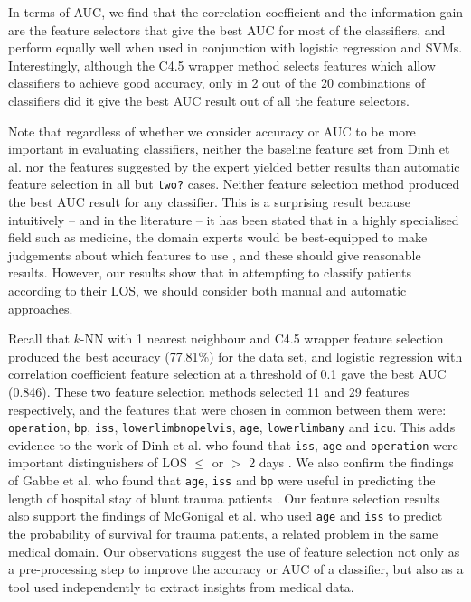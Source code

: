 \documentclass{article}
\begin{document}
In terms of AUC, we
find that the correlation coefficient and the information gain are the feature
selectors that give the best AUC for most of the classifiers, and perform
equally well when used in conjunction with logistic regression and SVMs.
Interestingly, although the C4.5
wrapper method selects features which allow classifiers to achieve good
accuracy, only in 2 out of the 20 combinations of classifiers did it give the
best AUC result out of all the feature selectors.

Note that regardless of whether we consider accuracy or AUC to be more
important in evaluating classifiers, neither the baseline
feature set from Dinh et al. \cite{Dinh2013a} nor the features suggested by
the expert yielded better
results than automatic feature selection in all but \texttt{two?} cases. Neither
feature selection method produced the best AUC result for any classifier.
This is a surprising result because intuitively -- and in the literature -- it
has been stated that in a highly specialised field such as medicine, the domain
experts would be best-equipped to make judgements about which features to
use \cite{Witten2005}, and these should give reasonable results. However,
our results show that in attempting to classify patients according to their
LOS, we should consider both manual and automatic approaches.

Recall that $k$-NN with 1 nearest neighbour and C4.5 wrapper feature
selection produced the best accuracy (77.81\%) for the data set, and
logistic regression with correlation coefficient feature selection at a
threshold of 0.1 gave the best AUC (0.846). These two feature selection
methods selected 11 and 29 features respectively, and the features that
were chosen in common between them were: \texttt{operation}, \texttt{bp},
\texttt{iss}, \texttt{lowerlimbnopelvis}, \texttt{age}, \texttt{lowerlimbany}
and \texttt{icu}. This adds evidence to the work of Dinh et al. who found
that \texttt{iss}, \texttt{age} and \texttt{operation} were important
distinguishers of LOS $\leq$ or $>$ 2 days \cite{Dinh2013a}. We also
confirm the findings of Gabbe et al. who found that \texttt{age},
\texttt{iss} and \texttt{bp} were useful in predicting the length of
hospital stay of blunt trauma patients \cite{Gabbe2005}. Our feature
selection results also
support the findings of McGonigal et al. \cite{McGonigal1993} who used
\texttt{age} and
\texttt{iss} to predict the probability of survival for trauma patients, a
related problem in the same medical domain.
Our observations suggest the use of feature selection not only as a
pre-processing step to improve the accuracy or AUC of a classifier, but also
as a tool used independently to extract insights from medical data.
\end{document}
